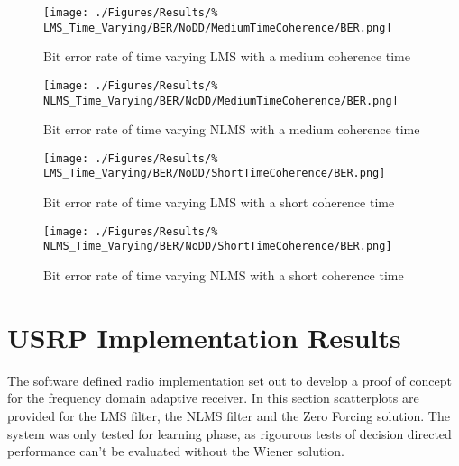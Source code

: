 \begin{figure}[ht]
	\centering
	\begin{minipage}{0.49\textwidth}
		\centering
		\texttt{[image: ./Figures/Results/\%
	LMS\_Time\_Varying/BER/NoDD/MediumTimeCoherence/BER.png]}
		\captionsetup{width=0.75\linewidth}
		\caption{Bit error rate of time varying LMS with a 
		medium coherence time}
	\end{minipage}
	\begin{minipage}{0.49\textwidth}
		\centering
		\texttt{[image: ./Figures/Results/\%
	NLMS\_Time\_Varying/BER/NoDD/MediumTimeCoherence/BER.png]}
		\captionsetup{width=0.75\linewidth}
		\caption{Bit error rate of time varying NLMS with a 
		medium coherence time}
	\end{minipage}
\end{figure}

\begin{figure}[ht]
	\centering
	\begin{minipage}{0.49\textwidth}
		\centering
		\texttt{[image: ./Figures/Results/\%
	LMS\_Time\_Varying/BER/NoDD/ShortTimeCoherence/BER.png]}
		\captionsetup{width=0.75\linewidth}
		\caption{Bit error rate of time varying LMS with a 
		short coherence time}
	\end{minipage}
	\begin{minipage}{0.49\textwidth}
		\centering
		\texttt{[image: ./Figures/Results/\%
	NLMS\_Time\_Varying/BER/NoDD/ShortTimeCoherence/BER.png]}
		\captionsetup{width=0.75\linewidth}
		\caption{Bit error rate of time varying NLMS with a 
		short coherence time}
	\end{minipage}
\end{figure}

\section{USRP Implementation Results}
\label{sec:USRPResults}
\FloatBarrier
The software defined radio implementation set out to develop %
a proof of concept for the frequency domain adaptive receiver. In %
this section scatterplots are provided for the LMS filter, the NLMS %
filter and the Zero Forcing solution. The system was only tested %
for learning phase, as rigourous tests of decision directed %
performance can't be evaluated without the Wiener solution.

